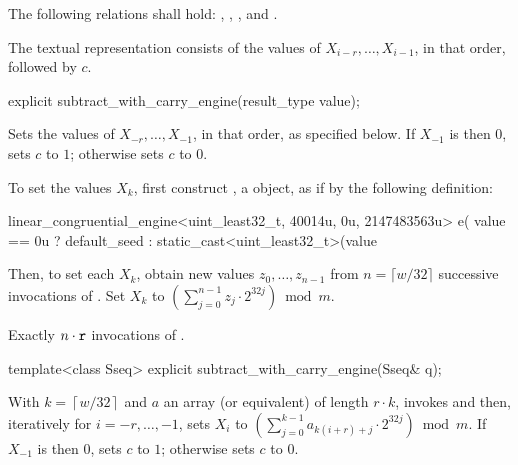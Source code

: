 \pnum
The following relations shall hold:
  ,
  ,
  ,
and
  .

\pnum
The textual representation
consists of the values of
 $X_{i-r}, \dotsc, X_{i-1}$,
in that order, followed by $c$.

%
\begin{itemdecl}
explicit subtract_with_carry_engine(result_type value);
\end{itemdecl}

\begin{itemdescr}
\pnum
\effects
 Sets the values of
 $X_{-r}, \dotsc, X_{-1}$,
 in that order, as specified below.
 If $X_{-1}$ is then $0$,
 sets $c$ to $1$;
 otherwise sets $c$ to $0$.

 To set the values $X_k$,
 first construct , a  object,
 as if by the following definition:
\begin{codeblock}
linear_congruential_engine<uint_least32_t, 40014u, 0u, 2147483563u> e(
  value == 0u ? default_seed : static_cast<uint_least32_t>(value %
\end{codeblock}
 Then, to set each $X_k$,
 obtain new values $z_0, \dotsc, z_{n-1}$
 from $n = \lceil w/32 \rceil$ successive invocations
 of .
 Set $X_k$ to $\left( \sum_{j=0}^{n-1} z_j \cdot 2^{32j}\right) \bmod m$.

\pnum
\complexity
Exactly $n \cdot \tcode{r}$ invocations
 of .
\end{itemdescr}

%
\begin{itemdecl}
template<class Sseq> explicit subtract_with_carry_engine(Sseq& q);
\end{itemdecl}

\begin{itemdescr}
\pnum
\effects
 With
 $k = \left\lceil w / 32 \right\rceil$
 and $a$ an array (or equivalent)
 of length $r \cdot k$,
 invokes 
 and then, iteratively for $i = -r, \dotsc, -1$,
 sets $X_i$
 to $ \left(\sum_{j=0}^{k-1}a_{k(i+r)+j} \cdot 2^{32j} \right) \bmod m $.
 If $X_{-1}$ is then $0$,
 sets $c$ to $1$;
 otherwise sets $c$ to $0$.
\end{itemdescr}


